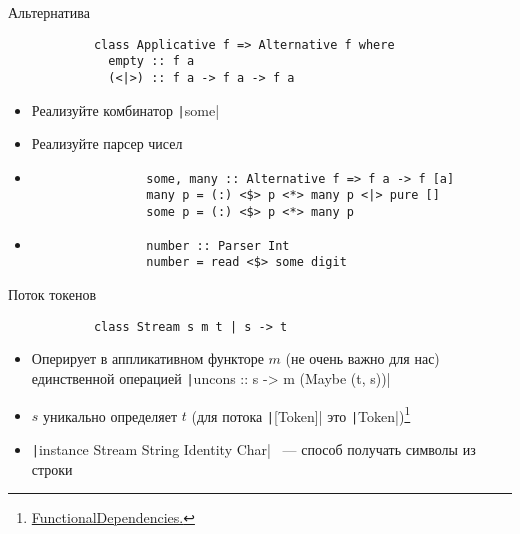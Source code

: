     \begin{frame}[fragile]{Альтернатива}
        \begin{verbatim}
            class Applicative f => Alternative f where
              empty :: f a
              (<|>) :: f a -> f a -> f a
        \end{verbatim}
        \begin{itemize}
            \item[\todo] Реализуйте комбинатор \texttt|some|
            \item[\todo] Реализуйте парсер чисел
            \item[\answer] \pause
            \begin{verbatim}
                some, many :: Alternative f => f a -> f [a]
                many p = (:) <$> p <*> many p <|> pure []
                some p = (:) <$> p <*> many p
            \end{verbatim}
            \item[\answer] \pause
            \begin{verbatim}
                number :: Parser Int
                number = read <$> some digit
            \end{verbatim}
        \end{itemize}
    \end{frame}


    \begin{frame}[fragile]{Поток токенов}
        \begin{verbatim}
            class Stream s m t | s -> t
        \end{verbatim}
        \begin{itemize}
             получать токены типа $t$ из оставшегося потока типа $s$
            \item Оперирует в аппликативном функторе $m$ (не очень важно для нас)
             единственной операцией \texttt|uncons :: s -> m (Maybe (t, s))|
            \item$s$ уникально определяет $t$ (для потока \texttt|[Token]| это \texttt|Token|)\footnote{\href{https://downloads.haskell.org/ghc/latest/docs/users_guide/exts/functional\_dependencies.html}{\color{blue} FunctionalDependencies.}}
            \item[\eg] \texttt|instance Stream String Identity Char| ~--- способ получать символы из строки
        \end{itemize}
    \end{frame}

